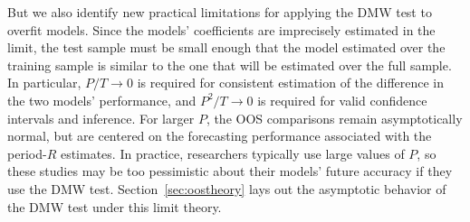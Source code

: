 \documentclass[12pt]{article}
\begin{document}
But we also identify new practical limitations for applying the DMW
test to overfit models.
Since the models' coefficients are imprecisely estimated in the limit,
the test sample must be small enough that the model estimated over the
training sample is similar to the one that will be estimated over the
full sample.  In particular, $P/T \to 0$ is required for consistent
estimation of the difference in the two models' performance,
and $P^2/T \to 0$ is required for valid confidence
intervals and inference.  For larger $P$, the OOS comparisons remain
asymptotically normal, but are centered on the forecasting performance
associated with the period-$R$ estimates.  In practice, researchers
typically use large values of $P$, so these studies may be too
pessimistic about their models' future accuracy if they use the DMW
test.  Section~\ref{sec:oostheory} lays out the asymptotic behavior of
the DMW test under this limit theory.
\end{document}
